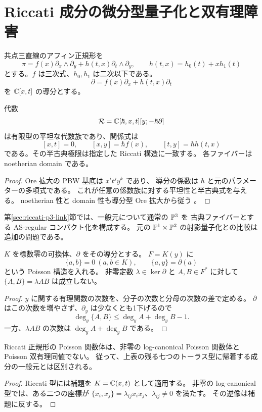 \section{Riccati 成分の微分型量子化と双有理障害}
\label{sec:riccati-quantum}

共点三直線のアフィン正規形を
\[
 \pi=f(x)\partial_x\wedge\partial_y
       +h(t,x)\partial_t\wedge\partial_y,
 \qquad h(t,x)=h_0(t)+xh_1(t)
\]
とする。$f$ は三次式、$h_0,h_1$ は二次以下である。
\[
 \partial=f(x)\partial_x+h(t,x)\partial_t
\]
を $\mathbb C[x,t]$ の導分とする。

\begin{proposition}\label{prop:riccati-ore}
代数
\[
 \mathcal R=\mathbb C[\hbar,x,t][y;-\hbar\partial]
\]
は有限型の平坦な代数族であり、関係式は
\[
 [x,t]=0,\qquad [x,y]=\hbar f(x),\qquad
 [t,y]=\hbar h(t,x)
\]
である。その半古典極限は指定した Riccati 構造に一致する。
各ファイバーは noetherian domain である。
\end{proposition}
\begin{proof}
Ore 拡大の PBW 基底は $x^it^jy^k$ であり、
導分の係数は $\hbar$ と元のパラメーターの多項式である。
これが任意の係数族に対する平坦性と半古典式を与える。
noetherian 性と domain 性も導分型 Ore 拡大から従う
\cite[\S1.3]{LiuWangWu}。
\end{proof}

第\ref{sec:riccati-p3-link}節では、一般元について通常の $\mathbb P^3$ を
古典ファイバーとする AS-regular コンパクト化を構成する。
元の $\mathbb P^1\times\mathbb P^2$ の射影量子化との比較は追加の問題である。

\begin{lemma}\label{lem:differential-poisson-obstruction}
$K$ を標数零の可換体、$\partial$ をその導分とする。
$F=K(y)$ に
\[
 \{a,b\}=0\ (a,b\in K),\qquad \{a,y\}=\partial(a)
\]
という Poisson 構造を入れる。
非零定数 $\lambda\in\ker\partial$ と $A,B\in F^*$ に対して
$\{A,B\}=\lambda AB$ は成立しない。
\end{lemma}
\begin{proof}
$y$ に関する有理関数の次数を、分子の次数と分母の次数の差で定める。
$\partial$ はこの次数を増やさず、$\partial_y$ は少なくとも1下げるので
\[
 \deg_y\{A,B\}\le\deg_y A+\deg_y B-1.
\]
一方、$\lambda AB$ の次数は $\deg_y A+\deg_y B$ である。
\end{proof}

\begin{corollary}\label{cor:riccati-not-log-poisson}
Riccati 正規形の Poisson 関数体は、非零の log-canonical
Poisson 関数体と Poisson 双有理同値でない。
従って、上表の残る七つのトーラス型に帰着する成分の一般元とは区別される。
\end{corollary}
\begin{proof}
Riccati 型には補題を $K=\mathbb C(x,t)$ として適用する。
非零の log-canonical 型では、ある二つの座標が
$\{x_i,x_j\}=\lambda_{ij}x_ix_j$、$\lambda_{ij}\ne0$ を満たす。
その逆像は補題に反する。
\end{proof}

